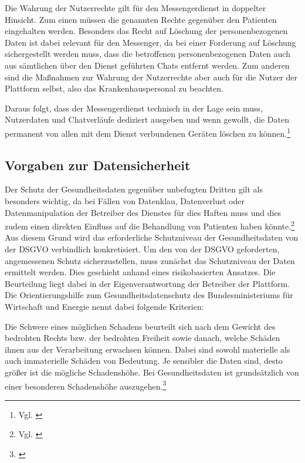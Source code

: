 Die Wahrung der Nutzerrechte gilt für den Messengerdienst in doppelter Hinsicht.
Zum einen müssen die genannten Rechte gegenüber den Patienten eingehalten werden. Besonders das Recht auf Löschung der personenbezogenen Daten ist dabei relevant für den Messenger, da bei einer Forderung auf Löschung sichergestellt werden muss, dass die betroffenen personenbezogenen Daten auch aus sämtlichen über den Dienst geführten Chats entfernt werden. Zum anderen sind die Maßnahmen zur Wahrung der Nutzerrechte aber auch für die Nutzer der Plattform selbst, also das Krankenhauspersonal zu beachten.

Daraus folgt, dass der Messengerdienst technisch in der Lage sein muss, Nutzerdaten und Chatverläufe dediziert ausgeben und wenn gewollt, die Daten permanent von allen mit dem Dienst verbundenen Geräten löschen zu können.\footnote{Vgl. \cite[S. 36 ff.]{Bundesaerztekammer2020}}

\subsection{Vorgaben zur Datensicherheit}\label{subsection:vzd}
Der Schutz der Gesundheitsdaten gegenüber unbefugten Dritten gilt als besonders wichtig, da bei Fällen von Datenklau, Datenverlust oder Datenmanipulation der Betreiber des Dienstes für dies Haften muss und dies zudem einen direkten Einfluss auf die Behandlung von Patienten haben könnte.\footnote{Vgl. \cite[S. 3]{Bundesaerztekammer2020}} Aus diesem Grund wird das erforderliche Schutzniveau der Gesundheitsdaten von der DSGVO verbindlich konkretisiert.
Um den von der DSGVO geforderten, angemessenen Schutz sicherzustellen, muss zunächst das Schutzniveau der Daten ermittelt werden.
Dies geschieht anhand eines risikobasierten Ansatzes. Die Beurteilung liegt dabei in der Eigenverantwortung der Betreiber der Plattform. Die \glqq Orientierungshilfe zum Gesundheitsdatenschutz\grqq{} des Bundesministeriums für Wirtschaft und Energie nennt dabei folgende Kriterien:

\glqq Die Schwere eines möglichen Schadens beurteilt sich nach dem Gewicht des bedrohten Rechts bzw. der bedrohten Freiheit sowie danach, welche Schäden ihnen aus der Verarbeitung erwachsen können. Dabei sind sowohl materielle als auch immaterielle Schäden von Bedeutung. Je sensibler die Daten sind, desto größer ist die mögliche Schadenshöhe. Bei Gesundheitsdaten ist grundsätzlich von einer besonderen Schadenshöhe auszugehen.\grqq{}\footnote{\cite[S. 41]{Bundesaerztekammer2020}}

